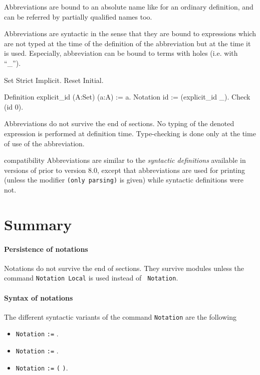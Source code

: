 Abbreviations are bound to an absolute name like for an ordinary
definition, and can be referred by partially qualified names too.

Abbreviations are syntactic in the sense that they are bound to
expressions which are not typed at the time of the definition of the
abbreviation but at the time it is used. Especially, abbreviation can
be bound to terms with holes (i.e. with ``\_'').

\Example

\begin{coq_eval}
Set Strict Implicit.
Reset Initial.
\end{coq_eval}
\begin{coq_example}
Definition explicit_id (A:Set) (a:A) := a.
Notation id := (explicit_id _).
Check (id 0).
\end{coq_example}

Abbreviations do not survive the end of sections. No typing of the denoted
expression is performed at definition time. Type-checking is done only
at the time of use of the abbreviation.

\Rem {} %
compatibility Abbreviations are similar to the {\em syntactic
definitions} available in versions of {\Coq} prior to version 8.0,
except that abbreviations are used for printing (unless the modifier
\verb=(only parsing)= is given) while syntactic definitions were not.

\section{Summary}

\paragraph{Persistence of notations}

Notations do not survive the end of sections. They survive modules
unless the command {\tt Notation Local} is used instead of {\tt
Notation}.

\paragraph{Syntax of notations}

The different syntactic variants of the command \texttt{Notation} are
the following

\begin{itemize}

\item \texttt{Notation} {\str} \texttt{:=} {\term}.

\item \texttt{Notation} {\ident} \texttt{:=} {\term}.

\item \texttt{Notation} {\str} \texttt{:=} {\term} {\tt (}  {\tt )}.

\end{itemize}

